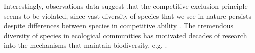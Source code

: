 \documentclass[%
 amsmath,amssymb,
 reprint,%
]{revtex4-2}
\begin{document}


Interestingly, observations data suggest that the competitive exclusion principle seems to be violated, since vast diversity of species that we see in nature persists despite differences
between species in competitive ability \cite{hutchinson1961paradox,chesson2000mechanisms}. 
The tremendous diversity of species in ecological communities has motivated decades of research into the mechanisms that maintain biodiversity, e.g. \cite{tilman1982resource,loreau1998biodiversity,verberk2011explaining,lynch2015ecology,fowler2013colonization,barabas2016effect,kalmykov2012mechanistic,kalmykov2013verification}. %
\end{document}
